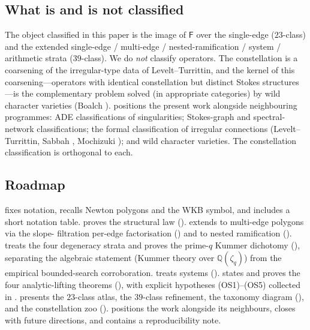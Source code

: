 \documentclass[11pt,a4paper]{article}
\theoremstyle{plain}
\theoremstyle{definition}
\theoremstyle{remark}
\newcommand{\Fclass}{\mathsf{F}}
\begin{document}
\subsection{What is and is not classified}\label{ssec:intro-scope}

The object classified in this paper is the image of $\Fclass$ over
the single-edge ($23$-class) and the extended single-edge / multi-edge
/ nested-ramification / system / arithmetic strata ($39$-class). We
do \emph{not} classify operators. The constellation is a coarsening of
the irregular-type data of Levelt--Turrittin, and the kernel of this
coarsening---operators with identical constellation but distinct
Stokes structures---is the complementary problem solved (in
appropriate categories) by wild character varieties (Boalch
\cite{boalch-stokes,boalch-wildhodge}).  positions
the present work alongside neighbouring programmes: ADE
classifications of singularities; Stokes-graph and spectral-network
classifications; the formal classification of irregular connections
(Levelt--Turrittin, Sabbah \cite{sabbah-isomon,sabbah-polarizable},
Mochizuki \cite{mochizuki-asymptotic}); and wild character varieties.
The constellation classification is orthogonal to each.

\subsection{Roadmap}\label{ssec:intro-organisation}

 fixes notation, recalls Newton polygons and the WKB
symbol, and includes a short notation table.
 proves the structural law ().
 extends to multi-edge polygons via the slope-
filtration per-edge factorisation () and to nested
ramification ().
 treats the four degeneracy strata and proves the
prime-$q$ Kummer dichotomy (), separating the algebraic
statement (Kummer theory over $\mathbb{Q}(\zeta_q)$) from the
empirical bounded-search corroboration.
 treats systems ().
 states and proves the four analytic-lifting
theorems (), with explicit
hypotheses (OS1)--(OS5) collected in .
 presents the $23$-class atlas, the $39$-class
refinement, the taxonomy diagram (), and the
constellation zoo ().
 positions the work alongside its neighbours,
 closes with future directions, and
 contains a reproducibility note.
\end{document}
